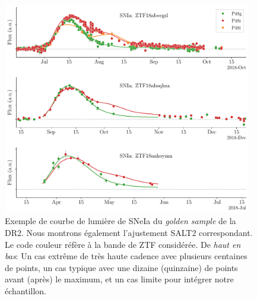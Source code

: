 \documentclass[../main/main.tex]{subfiles}
\begin{document}
\begin{figure}[ht!]
  \centering
  \includegraphics[width=0.97\textwidth]{../figures/09_dr2/lightcurve_example_dr2.pdf}
  \caption[Exemple de courbe de lumière de SNeIa du \textit{golden
    sample} de la DR2.]{Exemple de courbe de lumière de SNeIa du
    \textit{golden sample} de la DR2. Nous montrons également
    l'ajustement SALT2 correspondant. Le code couleur réfère à la bande
    de ZTF considérée. De \emph{haut en bas}: Un cas extrême de très
    haute cadence avec plusieurs centaines de points, un cas typique
    avec une dizaine (quinzaine) de points avant (après) le maximum, et
    un cas limite pour intégrer notre échantillon.}
  \label{fig:lc_example}
\end{figure}
\end{document}
